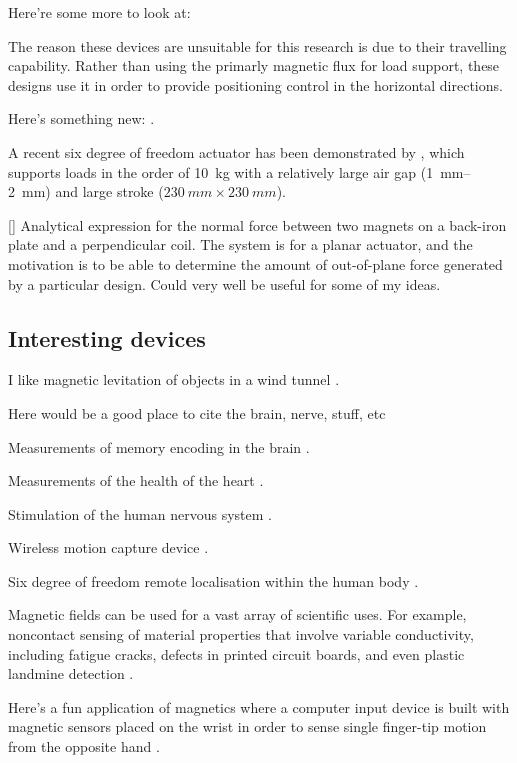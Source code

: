 Here're some more to look at: \textcite{boeij2008,zhang2008a}

The reason these devices are unsuitable for this research is due to their travelling capability.
Rather than using the primarly magnetic flux for load support, these designs use it in order to provide positioning control in the horizontal directions.

Here's something new: \textcite{shameli2008}.

A recent six degree of freedom actuator has been demonstrated by \textcite{jansen2008}, which supports loads in the order of \SI{10}{kg} with a relatively large air gap (\SI{1}{mm}--\SI{2}{mm}) and large stroke ($\SI{230}{mm}\times\SI{230}{mm}$).

[\textcite{dasilveira2005}] Analytical expression for the normal force between two magnets on a back-iron plate and a perpendicular coil.
The system is for a planar actuator, and the motivation is to be able to determine the amount of out-of-plane force generated by a particular design.
Could very well be useful for some of my ideas.


\subsection{Interesting devices}


I like magnetic levitation of objects in a wind tunnel \cite{higuchi2008}.

Here would be a good place to cite the brain, nerve, stuff, etc
\parencite{sekino2005,lu2008,demachi2008}

Measurements of memory encoding in the brain \cite{gjini2005}.

Measurements of the health of the heart \cite{lim2009}.

Stimulation of the human nervous system \cite{darabant2009}.

Wireless motion capture device \cite{hashi2005}.

Six degree of freedom remote localisation within the human body \cite{yang2009-ietm}.

Magnetic fields can be used for a vast array of scientific uses.
For example, noncontact sensing of material properties that involve variable conductivity, including fatigue cracks, defects in printed circuit boards, and even plastic landmine detection \cite{mukhopadhyay2005}.

Here's a fun application of magnetics where a computer input device is built with magnetic sensors placed on the wrist in order to sense single finger-tip motion from the opposite hand \parencite{han2008}.

